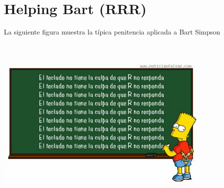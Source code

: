 \documentclass[]{book}
\begin{document}
\hypertarget{helping-bart-rrr}{%
\section{Helping Bart (RRR)}\label{helping-bart-rrr}}

La siguiente figura muestra la típica penitencia aplicada a Bart Simpson
\includegraphics[width=4.16667in,height=3.75in]{figuras/bart_33.jpeg}
\end{document}
